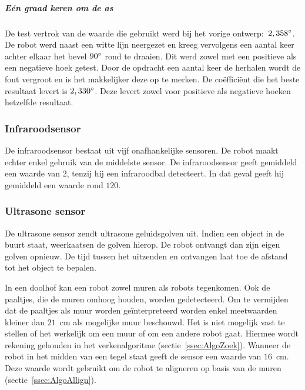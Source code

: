 \documentclass[tt3]{penoverslag}
\begin{document}

\subparagraph{E\'en graad keren om de as}
De test vertrok van de waarde die gebruikt werd bij het vorige ontwerp:~$2,358\degree$. De robot werd naast een witte lijn neergezet en kreeg vervolgens een aantal keer achter elkaar het bevel $90\degree$ rond te draaien. Dit werd zowel met een positieve als een negatieve hoek getest. Door de opdracht een aantal keer de herhalen wordt de fout vergroot en is het makkelijker deze op te merken.
De co\"effici\"ent die het beste resultaat levert is $2,330\degree$. Deze levert zowel voor positieve als negatieve hoeken hetzelfde resultaat.



\subsubsection{Infraroodsensor}
De infraroodsensor bestaat uit vijf onafhankelijke sensoren. De robot maakt echter enkel gebruik van de middelste sensor. De infraroodsensor geeft gemiddeld een waarde van $2$, tenzij hij een infraroodbal detecteert. In dat geval geeft hij gemiddeld een waarde rond $120$.

\subsubsection{Ultrasone sensor}
De ultrasone sensor zendt ultrasone geluidsgolven uit. Indien een object in de buurt staat, weerkaatsen de golven hierop. De robot ontvangt dan zijn eigen golven opnieuw. De tijd tussen het uitzenden en ontvangen laat toe de afstand tot het object te bepalen.

In een doolhof kan een robot zowel muren als robots tegenkomen. Ook de paaltjes, die de muren omhoog houden, worden gedetecteerd. Om te vermijden dat de paaltjes als muur worden ge\"interpreteerd worden enkel meetwaarden kleiner dan $21$~cm als mogelijke muur beschouwd. Het is niet mogelijk vast te stellen of het werkelijk om een muur of om een andere robot gaat. Hiermee wordt rekening gehouden in het verkenalgoritme (sectie~\ref{ssec:AlgoZoek}). Wanneer de robot in het midden van een tegel staat geeft de sensor een waarde van $16$~cm. Deze waarde wordt gebruikt om de robot te aligneren op basis van de muren (sectie~\ref{ssec:AlgoAllign}).
\end{document}
